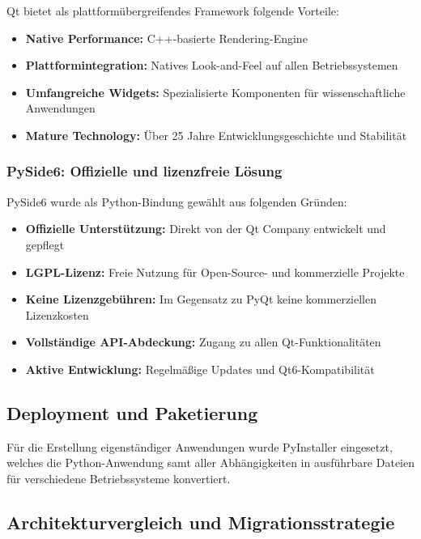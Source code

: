 Qt \parencite{Qt6} bietet als plattformübergreifendes Framework folgende Vorteile:

\begin{itemize}
    \item \textbf{Native Performance:} C++-basierte Rendering-Engine
    \item \textbf{Plattformintegration:} Natives Look-and-Feel auf allen Betriebssystemen
    \item \textbf{Umfangreiche Widgets:} Spezialisierte Komponenten für wissenschaftliche Anwendungen
    \item \textbf{Mature Technology:} Über 25 Jahre Entwicklungsgeschichte und Stabilität
\end{itemize}

\subsubsection{PySide6: Offizielle und lizenzfreie Lösung}

PySide6 \parencite{PySide6} wurde als Python-Bindung gewählt aus folgenden Gründen:

\begin{itemize}
    \item \textbf{Offizielle Unterstützung:} Direkt von der Qt Company entwickelt und gepflegt
    \item \textbf{LGPL-Lizenz:} Freie Nutzung für Open-Source- und kommerzielle Projekte
    \item \textbf{Keine Lizenzgebühren:} Im Gegensatz zu PyQt keine kommerziellen Lizenzkosten
    \item \textbf{Vollständige API-Abdeckung:} Zugang zu allen Qt-Funktionalitäten
    \item \textbf{Aktive Entwicklung:} Regelmäßige Updates und Qt6-Kompatibilität
\end{itemize}

\subsection{Deployment und Paketierung}

Für die Erstellung eigenständiger Anwendungen wurde PyInstaller \parencite{PyInstaller} eingesetzt, welches die Python-Anwendung samt aller Abhängigkeiten in ausführbare Dateien für verschiedene Betriebssysteme konvertiert.

\subsection{Architekturvergleich und Migrationsstrategie}

